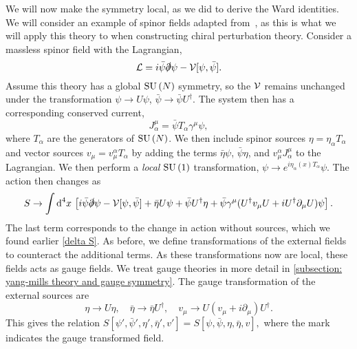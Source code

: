 We will now make the symmetry local, as we did to derive the Ward identities.
We will consider an example of spinor fields adapted from~\autocite{schererIntroductionChiralPerturbation2002}, as this is what we will apply this theory to when constructing chiral perturbation theory.
Consider a massless spinor field with the Lagrangian,
%
\begin{equation}
    \mathcal{L} = i \bar \psi \slashed \partial \psi - \mathcal{V}[\psi, \bar \psi].
\end{equation}
%
Assume this theory has a global $\text{SU}\left(N\right)$ symmetry, so the $\mathcal{V}$ remains unchanged under the transformation $\psi \rightarrow U \psi$, $\bar \psi \rightarrow \bar \psi U^\dagger$.
The system then has a corresponding conserved current,
%
\begin{equation}
    J_\alpha^\mu = \bar \psi T_\alpha \gamma^\mu \psi,
\end{equation}
%
where $T_\alpha$ are the generators of $\text{SU}\left(N\right)$.
We then include spinor sources $\eta = \eta_\alpha T_\alpha$ and vector sources $v_\mu = v_\mu^\alpha T_\alpha$ by adding the terms $ \bar \eta \psi$, $\bar \psi \eta$, and $v_\mu^\alpha J^\mu_\alpha$ to the Lagrangian.
We then perform a \emph{local} $\text{SU}\left(1\right)$ transformation, $\psi \rightarrow e^{i\eta_\alpha(x)T_\alpha} \psi$.
The action then changes as
%
\begin{equation}
    S \rightarrow 
    \int \text{d}^4 x \,
    \left[
        i \bar \psi \slashed \partial \psi 
        - \mathcal{V}[\psi, \bar \psi]
        + \bar \eta U \psi
        + \bar \psi U^\dagger \eta 
        + \bar \psi \gamma^\mu (U^\dagger v_\mu U + i U^\dagger \partial_\mu U)\psi
    \right].
\end{equation}
%
The last term corresponds to the change in action without sources, which we found earlier \autoref{delta S}.
As before, we define transformations of the external fields to counteract the additional terms.
As these transformations now are local, these fields acts as gauge fields.
We treat gauge theories in more detail in \autoref{subsection: yang-mills theory and gauge symmetry}.
The gauge transformation of the external sources are
%
\begin{equation}
    \eta \rightarrow U \eta, \quad
    \bar \eta \rightarrow \bar \eta U^\dagger,\quad
    v_\mu \rightarrow U(v_\mu + i \partial_\mu) U^\dagger.
\end{equation}
%
This gives the relation
$
    S[\psi', \bar \psi', \eta', \bar \eta', v'] =
    S[\psi, \bar \psi, \eta, \bar \eta, v],
$
where the mark indicates the gauge transformed field.
